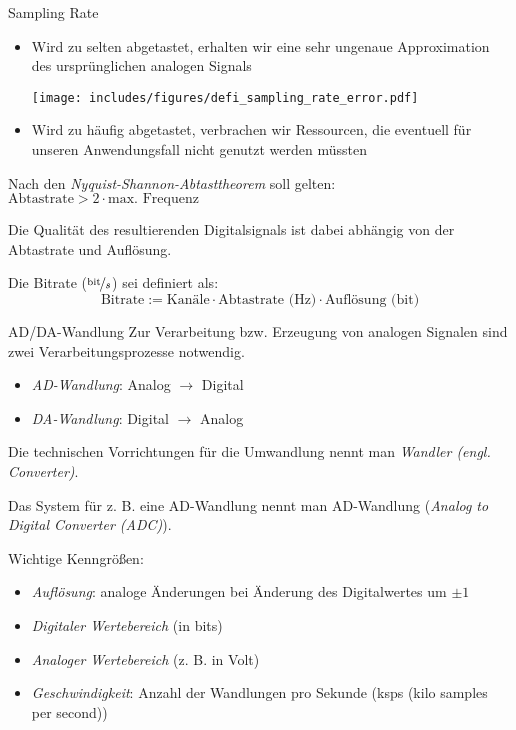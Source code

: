 \begin{defi}{Sampling Rate}
    \begin{itemize}
        \item Wird zu selten abgetastet, erhalten wir eine sehr ungenaue Approximation des ursprünglichen analogen Signals

              \begin{center}
                  \texttt{[image: includes/figures/defi\_sampling\_rate\_error.pdf]}
              \end{center}
        \item Wird zu häufig abgetastet, verbrachen wir Ressourcen, die eventuell für unseren Anwendungsfall nicht genutzt werden müssten
    \end{itemize}

    Nach den \emph{Nyquist-Shannon-Abtasttheorem} soll gelten: $\text{Abtastrate} > 2 \cdot \text{max. Frequenz}$

    Die Qualität des resultierenden Digitalsignals ist dabei abhängig von der Abtastrate und Auflösung.

    Die Bitrate ($\nicefrac{\text{bit}}{s}$) sei definiert als:
    \[
        \text{Bitrate} := \text{Kanäle} \cdot \text{Abtastrate (Hz)} \cdot \text{Auflösung (bit)}
    \]
\end{defi}

\begin{defi}{AD/DA-Wandlung}
    Zur Verarbeitung bzw. Erzeugung von analogen Signalen sind zwei Verarbeitungsprozesse notwendig.
    \begin{itemize}
        \item \emph{AD-Wandlung}: Analog $\to$ Digital
        \item \emph{DA-Wandlung}: Digital $\to$ Analog
    \end{itemize}

    Die technischen Vorrichtungen für die Umwandlung nennt man \emph{Wandler (engl. Converter)}.

    Das System für z. B. eine AD-Wandlung nennt man AD-Wandlung (\emph{Analog to Digital Converter (ADC)}).

    Wichtige Kenngrößen:
    \begin{itemize}
        \item \emph{Auflösung}: analoge Änderungen bei Änderung des Digitalwertes um $\pm 1$
        \item \emph{Digitaler Wertebereich} (in bits)
        \item \emph{Analoger Wertebereich} (z. B. in Volt)
        \item \emph{Geschwindigkeit}: Anzahl der Wandlungen pro Sekunde (ksps (kilo samples per second))
    \end{itemize}
\end{defi}

